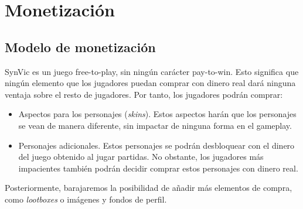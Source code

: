 \chapter{Monetización}
\section{Modelo de monetización}
SynVic es un juego free-to-play, sin ningún carácter pay-to-win. Esto significa que ningún elemento que los jugadores puedan comprar con dinero real dará ninguna ventaja sobre el resto de jugadores. Por tanto, los jugadores podrán comprar:

\begin{itemize}
	\item Aspectos para los personajes (\emph{skins}). Estos aspectos harán que los personajes se vean de manera diferente, sin impactar de ninguna forma en el gameplay.
	\item Personajes adicionales. Estos personajes se podrán desbloquear con el dinero del juego obtenido al jugar partidas. No obstante, los jugadores más impacientes también podrán decidir comprar estos personajes con dinero real.
\end{itemize}

Posteriormente, barajaremos la posibilidad de añadir más elementos de compra, como \emph{lootboxes} o imágenes y fondos de perfil.